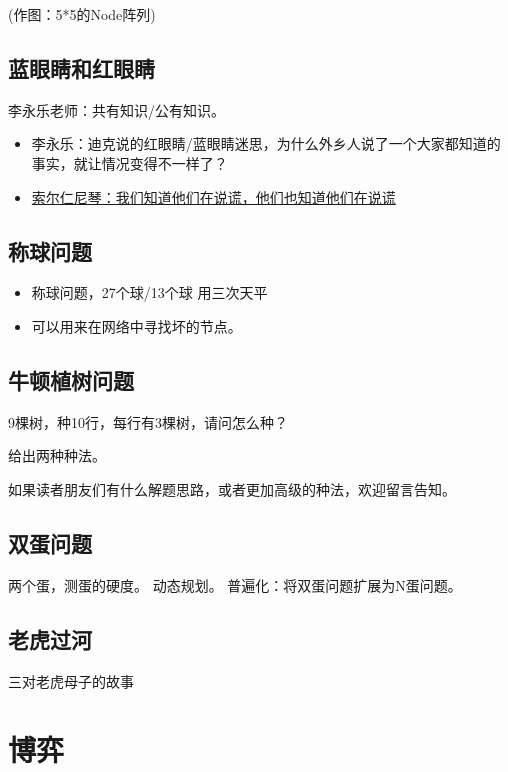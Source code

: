 \documentclass[12pt, letterpaper]{ctexrep}
\begin{document}
(作图：5*5的Node阵列)


\section{蓝眼睛和红眼睛}
李永乐老师：共有知识/公有知识。


\begin{itemize}
\item{ 李永乐：迪克说的红眼睛/蓝眼睛迷思，为什么外乡人说了一个大家都知道的事实，就让情况变得不一样了？ }
\item{ \href{http://cnwmw.blogspot.com/2019/04/blog-post_92.html}{索尔仁尼琴：我们知道他们在说谎，他们也知道他们在说谎} }
\end{itemize}



\section{称球问题}

\begin{itemize}
\item{ 称球问题，27个球/13个球 用三次天平 }
\item{ 可以用来在网络中寻找坏的节点。 }
\end{itemize}



\section{牛顿植树问题}
9棵树，种10行，每行有3棵树，请问怎么种？

给出两种种法。

如果读者朋友们有什么解题思路，或者更加高级的种法，欢迎留言告知。


\section{双蛋问题}
两个蛋，测蛋的硬度。
动态规划。
普遍化：将双蛋问题扩展为N蛋问题。


\section{老虎过河}
三对老虎母子的故事




\chapter{博弈}
\end{document}
